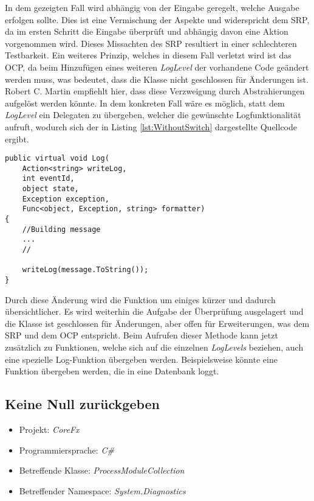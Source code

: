 \SuperPar In dem gezeigten Fall wird abhängig von der Eingabe geregelt, welche Ausgabe erfolgen sollte. Dies ist eine Vermischung der Aspekte und widerspricht dem SRP, da im ersten Schritt die Eingabe überprüft und abhängig davon eine Aktion vorgenommen wird. Dieses Missachten des SRP resultiert in einer schlechteren Testbarkeit. Ein weiteres Prinzip, welches in diesem Fall verletzt wird ist das OCP, da beim Hinzufügen eines weiteren \textit{LogLevel} der vorhandene Code geändert werden muss, was bedeutet, dass die Klasse nicht geschlossen für Änderungen ist. Robert C. Martin empfiehlt hier, dass diese Verzweigung durch Abstrahierungen aufgelöst werden könnte. In dem konkreten Fall wäre es möglich, statt dem \textit{LogLevel} ein Delegaten zu übergeben, welcher die gewünschte Logfunktionalität aufruft, wodurch sich der in Listing \ref{lst:WithoutSwitch} dargestellte Quellcode ergibt.

\begin{lstlisting}[language={[Sharp]C}, caption=Beispiel für Verwendung eines Delegaten statt eines Switch Statements, label=lst:WithoutSwitch]
public virtual void Log(
	Action<string> writeLog,
	int eventId,
	object state,
	Exception exception,
	Func<object, Exception, string> formatter)
{
	//Building message
	...
	//

	writeLog(message.ToString());
}
\end{lstlisting}

\SuperPar Durch diese Änderung wird die Funktion um einiges kürzer und dadurch übersichtlicher. Es wird weiterhin die Aufgabe der Überprüfung ausgelagert und die Klasse ist geschlossen für Änderungen, aber offen für Erweiterungen, was dem SRP und dem OCP entspricht. Beim Aufrufen dieser Methode kann jetzt zusätzlich zu Funktionen, welche sich auf die einzelnen \textit{LogLevels} beziehen, auch eine spezielle Log-Funktion übergeben werden. Beispielsweise könnte eine Funktion übergeben werden, die in eine Datenbank loggt. 

\subsection{Keine Null zurückgeben}
\begin{itemize}
	\item Projekt: \textit{CoreFx}
	\item Programmiersprache: \textit{C\#}
	\item Betreffende Klasse: \textit{ProcessModuleCollection}
	\item Betreffender Namespace: \textit{System.Diagnostics}
\end{itemize}

